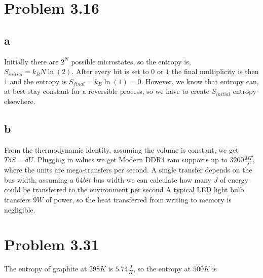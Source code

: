 \section*{Problem 3.16}
\subsection*{a}
Initially there are $2^N$ possible microstates, so the entropy is, $S_{initial} = k_B N \ln(2)$. After every bit is set to $0$ or $1$ the final multiplicity is then $1$ and the entropy is $S_{final} = k_B\ln(1) = 0$. However, we know that entropy can, at best stay constant for a reversible process, so we have to create $S_{initial}$ entropy elsewhere.
\subsection*{b}
From the thermodynamic identity, assuming the volume is constant, we get $T\delta S = \delta U$. Plugging in values we get
Modern DDR4 ram supports up to $3200 \frac{MT}{s}$, where the units are mega-transfers per second. A single transfer depends on the bus width, assuming a $64bit$ bus width we can calculate how many $J$ of energy could be transferred to the environment per second
A typical LED light bulb transfers $9W$ of power, so the heat transferred from writing to memory is negligible.

\section*{Problem 3.31}
The entropy of graphite at $298K$ is $5.74\frac{J}{K}$, so the entropy at $500K$ is
